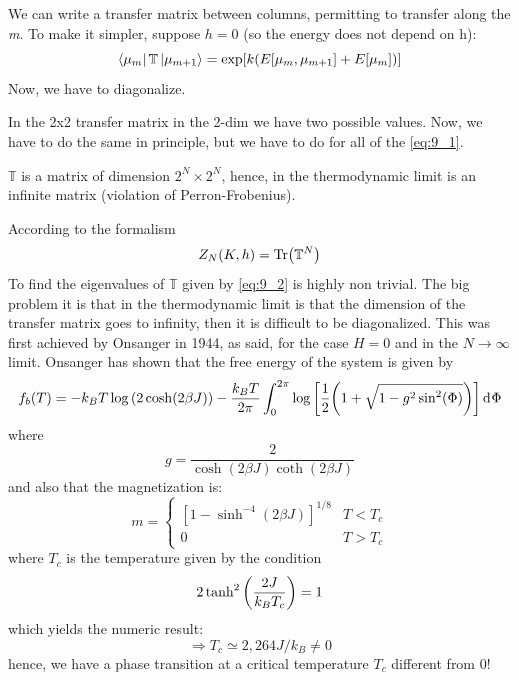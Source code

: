 \documentclass[../main/main.tex]{subfiles}
\begin{document}
We can write a transfer matrix between columns, permitting to transfer along the \emph{m}. To make it simpler, suppose \( h=0 \) (so the energy does not depend on h):
\begin{equation}
  \bra{\mu _m} \mathbb{T} \ket{\mu _{m+1}} = \exp [ k(E [\mu _m, \mu _{m+1}] + E [ \mu _m])]
  \label{eq:9_2}
\end{equation}
Now, we have to diagonalize. 
\begin{remark}
In the 2x2 transfer matrix in the 2-dim we have two possible values. Now, we have to do the same in principle, but we have to do for all of the \eqref{eq:9_1}.
\end{remark}
\begin{remark}
\( \mathbb{T} \) is a matrix of dimension \( 2^N \times 2^N \), hence, in the thermodynamic limit is an infinite matrix (violation of Perron-Frobenius).
\end{remark}
According to the formalism
\begin{equation*}
  Z_{N} (K,h) = \Tr(\mathbb{T}^N)
\end{equation*}
To find the eigenvalues of \( \mathbb{T} \) given by  \eqref{eq:9_2} is highly non trivial. The big problem it is that in the thermodynamic limit is that the dimension of the transfer matrix goes to infinity, then it is difficult to be diagonalized. This was first achieved by Onsanger in 1944, as said, for the case \( H=0 \) and in the \( N \rightarrow \infty  \) limit. Onsanger has shown that the free energy of the system is given by
\begin{equation}
  f_b (T) = -k_B T \log{\qty(2 \cosh(2 \beta J))- \frac{k_B T}{2 \pi} \int_{0}^{2\pi} \log{\qty[\frac{1}{2}\qty(1+ \sqrt{1-g^2 \sin^2(\Phi) } )] } \dd[]{\Phi }  }
\end{equation}
 where
\begin{equation*}
  g = \frac{2}{\cosh(2 \beta J)\coth(2 \beta J)}
\end{equation*}
and also that the magnetization is:
\begin{equation}
 m= \begin{cases}
 \left[1-\sinh ^{-4}(2\beta J)\right]^{1/8}&T<T_{c}\\
 0&T>T_{c}
 \end{cases}    
\end{equation}
where \(T_c\) is the temperature given by the condition
\begin{equation*}
  2 \tanh^2 \qty(\frac{2J}{k_B T_c}) = 1 
\end{equation*}
 which yields the numeric result:
 \begin{equation*} \Rightarrow T_c \simeq 2,264 J/k_B \neq 0
\end{equation*}
hence, we have a phase transition at a critical temperature \(T_c\) different from 0!
\end{document}

